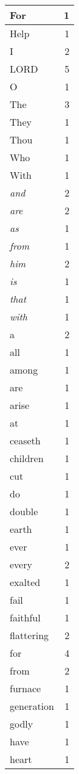 \begin{center}
\begin{longtable}{l|r}
\hline \hline
\endlastfoot
For & 1 \\ \hline
Help & 1 \\ \hline
I & 2 \\ \hline
LORD & 5 \\ \hline
O & 1 \\ \hline
The & 3 \\ \hline
They & 1 \\ \hline
Thou & 1 \\ \hline
Who & 1 \\ \hline
With & 1 \\ \hline
\emph{and} & 2 \\ \hline
\emph{are} & 2 \\ \hline
\emph{as} & 1 \\ \hline
\emph{from} & 1 \\ \hline
\emph{him} & 2 \\ \hline
\emph{is} & 1 \\ \hline
\emph{that} & 1 \\ \hline
\emph{with} & 1 \\ \hline
a & 2 \\ \hline
all & 1 \\ \hline
among & 1 \\ \hline
are & 1 \\ \hline
arise & 1 \\ \hline
at & 1 \\ \hline
ceaseth & 1 \\ \hline
children & 1 \\ \hline
cut & 1 \\ \hline
do & 1 \\ \hline
double & 1 \\ \hline
earth & 1 \\ \hline
ever & 1 \\ \hline
every & 2 \\ \hline
exalted & 1 \\ \hline
fail & 1 \\ \hline
faithful & 1 \\ \hline
flattering & 2 \\ \hline
for & 4 \\ \hline
from & 2 \\ \hline
furnace & 1 \\ \hline
generation & 1 \\ \hline
godly & 1 \\ \hline
have & 1 \\ \hline
heart & 1 \\ \hline

\end{longtable}
\end{center}
